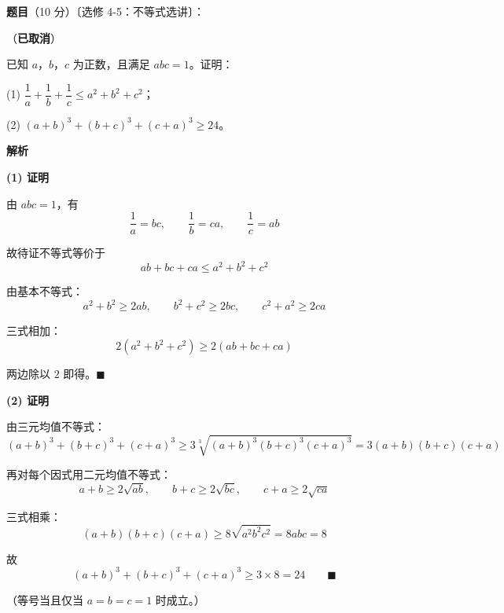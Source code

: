 \begin{answer}

\textbf{题目}（10 分）〔选修 4-5：不等式选讲〕：

（\textbf{已取消}）

已知 $a$，$b$，$c$ 为正数，且满足 $abc=1$。证明：

  (1) $\dfrac1a+\dfrac1b+\dfrac1c\le a^{2}+b^{2}+c^{2}$；

  (2) $(a+b)^{3}+(b+c)^{3}+(c+a)^{3}\ge24$。

\par\medskip

\textbf{解析}

\textbf{(1) 证明}

由 $abc=1$，有
\nopagebreak[4]
\[\frac1a=bc,\qquad \frac1b=ca,\qquad \frac1c=ab\]

故待证不等式等价于
\nopagebreak[4]
\[ab+bc+ca\le a^{2}+b^{2}+c^{2}\]

由基本不等式：
\nopagebreak[4]
\[a^{2}+b^{2}\ge2ab,\qquad b^{2}+c^{2}\ge2bc,\qquad c^{2}+a^{2}\ge2ca\]

三式相加：
\nopagebreak[4]
\[2\left(a^{2}+b^{2}+c^{2}\right)\ge2(ab+bc+ca)\]

两边除以 $2$ 即得。$\blacksquare$

\textbf{(2) 证明}

由三元均值不等式：
\nopagebreak[4]
\[(a+b)^{3}+(b+c)^{3}+(c+a)^{3}\ge3\sqrt[3]{(a+b)^{3}(b+c)^{3}(c+a)^{3}}=3(a+b)(b+c)(c+a)\]

再对每个因式用二元均值不等式：
\nopagebreak[4]
\[a+b\ge2\sqrt{ab},\qquad b+c\ge2\sqrt{bc},\qquad c+a\ge2\sqrt{ca}\]

三式相乘：
\nopagebreak[4]
\[(a+b)(b+c)(c+a)\ge8\sqrt{a^{2}b^{2}c^{2}}=8abc=8\]

故
\nopagebreak[4]
\[(a+b)^{3}+(b+c)^{3}+(c+a)^{3}\ge3\times8=24\qquad\blacksquare\]

（等号当且仅当 $a=b=c=1$ 时成立。）



\end{answer}